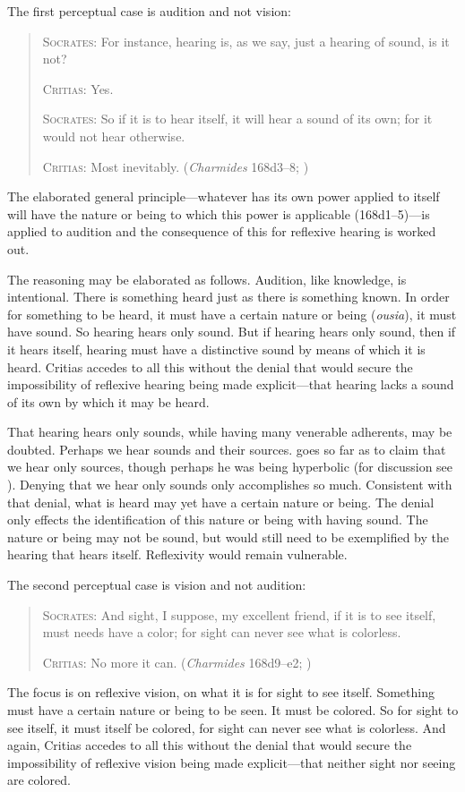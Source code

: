 The first perceptual case is audition and not vision:
\begin{quotation}
	\textsc{Socrates}: For instance, hearing is, as we say, just a hearing of sound, is it not?
	
	\textsc{Critias}: Yes.
	
	\textsc{Socrates}: So if it is to hear itself, it will hear a sound of its own; for it would not hear otherwise.
	
	\textsc{Critias}: Most inevitably. (\emph{Charmides} 168d3–8; \citealt[63]{Lamb:1927qw})
\end{quotation}
The elaborated general principle—whatever has its own power applied to itself will have the nature or being to which this power is applicable (168d1–5)—is applied to audition and the consequence of this for reflexive hearing is worked out.

The reasoning may be elaborated as follows. Audition, like knowledge, is intentional. There is something heard just as there is something known. In order for something to be heard, it must have a certain nature or being (\emph{ousia}), it must have sound. So hearing hears only sound. But if hearing hears only sound, then if it hears itself, hearing must have a distinctive sound by means of which it is heard. Critias accedes to all this without the denial that would secure the impossibility of reflexive hearing being made explicit—that hearing lacks a sound of its own by which it may be heard.

That hearing hears only sounds, while having many venerable adherents, may be doubted. Perhaps we hear sounds and their sources. \citet{Heidegger:1935uq} goes so far as to claim that we hear only sources, though perhaps he was being hyperbolic (for discussion see \citealt[chapters 3 and 4]{Kalderon:2018oe}). Denying that we hear only sounds only accomplishes so much. Consistent with that denial, what is heard may yet have a certain nature or being. The denial only effects the identification of this nature or being with having sound. The nature or being may not be sound, but would still need to be exemplified by the hearing that hears itself. Reflexivity would remain vulnerable.

The second perceptual case is vision and not audition:
\begin{quotation}
	\textsc{Socrates}: And sight, I suppose, my excellent friend, if it is to see itself, must needs have a color; for sight can never see what is colorless.
	
	\textsc{Critias}: No more it can. (\emph{Charmides} 168d9–e2; \citealt[63]{Lamb:1927qw})
\end{quotation}
The focus is on reflexive vision, on what it is for sight to see itself. Something must have a certain nature or being to be seen. It must be colored. So for sight to see itself, it must itself be colored, for sight can never see what is colorless. And again, Critias accedes to all this without the denial that would secure the impossibility of reflexive vision being made explicit—that neither sight nor seeing are colored.

